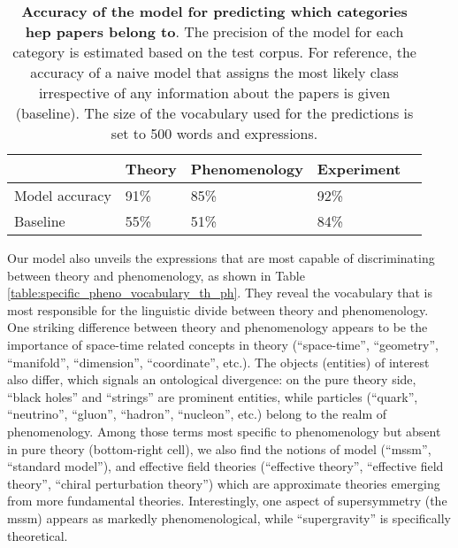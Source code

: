 \documentclass[smallextended]{svjour3}
\begin{document}
\begin{table}[h]
\centering
\begin{tabular}{@{}lllll@{}}
\toprule
               & Theory & Phenomenology & Experiment &  \\ \midrule
Model accuracy & 91\%   & 85\%          & 92\%       &  \\
Baseline       & 55\%   & 51\%          & 84\%       &  \\ \bottomrule
\end{tabular}
\caption{\textbf{Accuracy of the model for predicting which categories \gls{hep} papers belong to}. The precision of the model for each category is estimated based on the test corpus. For reference, the accuracy of a naive model that assigns the most likely class irrespective of any information about the papers is given (baseline). The size of the vocabulary used for the predictions is set to 500 words and expressions. }
    \label{table:categories_bow_prediction}
\end{table}

Our model also unveils the expressions that are most capable of discriminating between theory and phenomenology, as shown in Table \ref{table:specific_pheno_vocabulary_th_ph}. They reveal the vocabulary that is most responsible for the linguistic divide between theory and phenomenology. One striking difference between theory and phenomenology appears to be the importance of space-time related concepts in theory (``space-time'', ``geometry'',  ``manifold'', ``dimension'', ``coordinate'', etc.). The objects (entities) of interest also differ, which signals an ontological divergence: on the pure theory side, ``black holes'' and ``strings'' are prominent entities, while particles (``quark'', ``neutrino'', ``gluon'', ``hadron'', ``nucleon'', etc.) belong to the realm of phenomenology. Among those terms most specific to phenomenology but absent in pure theory (bottom-right cell), we also  find the notions of model (``mssm'', ``standard model''), and effective field theories (``effective theory'', ``effective field theory'', ``chiral perturbation theory'') which are approximate theories emerging from more fundamental theories. Interestingly, one aspect of supersymmetry (the \gls{mssm}) appears as markedly phenomenological, while ``supergravity'' is specifically theoretical.


\setlength\extrarowheight{2pt}
\end{document}
